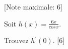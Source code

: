 \begin{question}
  \hspace*{\fill} [Note maximale: 6]\par
  \medskip
  \noindent Soit $h(x) = \frac{6x}{cos x}.$\par
  \medskip
  Trouvez $h^\prime(0)$.\hspace*{\fill} [6]\par
\end{question}

